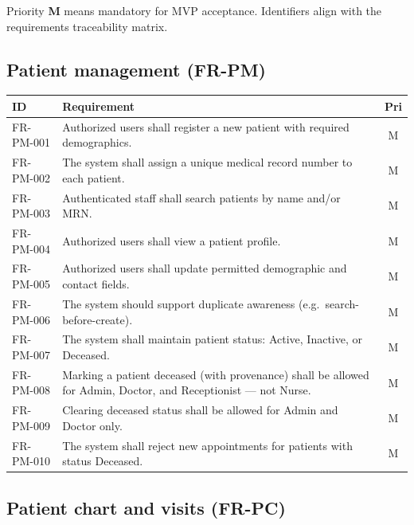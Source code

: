 \documentclass[11pt,a4paper]{article}
\begin{document}
Priority \textbf{M} means mandatory for MVP acceptance. Identifiers align with the requirements traceability matrix.

\subsection{Patient management (FR-PM)}

\begin{longtable}{@{}p{2.2cm}p{11.2cm}c@{}}
\toprule
\textbf{ID} & \textbf{Requirement} & \textbf{Pri} \\
\midrule
\endhead
FR-PM-001 & Authorized users shall register a new patient with required demographics. & M \\
FR-PM-002 & The system shall assign a unique medical record number to each patient. & M \\
FR-PM-003 & Authenticated staff shall search patients by name and/or MRN. & M \\
FR-PM-004 & Authorized users shall view a patient profile. & M \\
FR-PM-005 & Authorized users shall update permitted demographic and contact fields. & M \\
FR-PM-006 & The system should support duplicate awareness (e.g.\ search-before-create). & M \\
FR-PM-007 & The system shall maintain patient status: Active, Inactive, or Deceased. & M \\
FR-PM-008 & Marking a patient deceased (with provenance) shall be allowed for Admin, Doctor, and Receptionist --- not Nurse. & M \\
FR-PM-009 & Clearing deceased status shall be allowed for Admin and Doctor only. & M \\
FR-PM-010 & The system shall reject new appointments for patients with status Deceased. & M \\
\bottomrule
\end{longtable}

\subsection{Patient chart and visits (FR-PC)}
\end{document}

